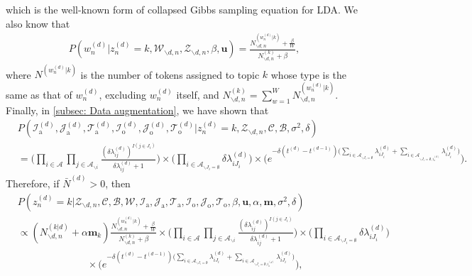 \documentclass[a4paper]{article}
\begin{document}
 which is the well-known form of collapsed Gibbs sampling equation for LDA. We also know that \begin{equation}
 \begin{aligned} 
 P(w^{(d)}_n|z^{(d)}_n=k, \mathcal{W}_{\backslash d, n}, \mathcal{Z}_{\backslash d, n}, \beta, \boldsymbol{u} )=\frac{N^{(w_n^{(d)}|k)}_{\backslash d, n}+\frac{\beta}{W} }{N^{(k)}_{\backslash d, n}+\beta},
 \end{aligned}
 \end{equation}
 where $N^{(w_n^{(d)}|k)}$ is the number of tokens assigned to topic $k$ whose type is the same as that of $w_n^{(d)}$, excluding $w_n^{(d)}$ itself, and $N^{(k)}_{\backslash d, n}=\sum_{w=1}^W N_{\backslash d, n}^{(w_n^{(d)}|k)}$. Finally, in \ref{subsec: Data augmentation}, we have shown that
 \begin{equation}
 \begin{aligned}
& P(\mathcal{I}^{(d)}_{\mbox{a}}, \mathcal{J}^{(d)}_{\mbox{a}}, \mathcal{T}^{(d)}_{\mbox{a}}, \mathcal{I}^{(d)}_{\mbox{o}}, \mathcal{J}^{(d)}_{\mbox{o}}, \mathcal{T}^{(d)}_{\mbox{o}}| z^{(d)}_n=k, \mathcal{Z}_{\backslash d, n}, \mathcal{C}, \mathcal{B}, \sigma^2, \delta)\\&=\Big(\prod_{i\in \mathcal{A}}\prod_{j \in \mathcal{A}_{\backslash i }} \frac{(\delta\lambda^{(d)}_{ij})^{I(j \in J_i)}}{\delta\lambda^{(d)}_{ij}+1}\Big)\times \Big(\prod_{i\in \mathcal{A}_{\backslash J_i=\emptyset}} \delta\lambda^{(d)}_{iJ_i}\Big) \times \Big(e^{-\delta(t^{(d)}-t^{(d-1)})\big(\sum\limits_{i \in \mathcal{A}_{\backslash J_i=\emptyset}}\lambda^{(d)}_{i{J_i}}+\sum\limits_{i \in \mathcal{A}_{\backslash J_i=\emptyset, i_o^{(d)}}}\lambda^{(d)}_{i{J_i}}\big)}\Big).
 \end{aligned}
 \end{equation}
 Therefore, if $\bar N^{(d)} > 0$, then
 \begin{equation}
 \begin{aligned}
  &P(z^{(d)}_n=k|\mathcal{Z}_{\backslash d, n},   \mathcal{C},   \mathcal{B},\mathcal{W}, \mathcal{I}_{\mbox{a}}, \mathcal{J}_{\mbox{a}}, \mathcal{T}_{\mbox{a}}, \mathcal{I}_{\mbox{o}}, \mathcal{J}_{\mbox{o}}, \mathcal{T}_{\mbox{o}}, \beta, \boldsymbol{u}, \alpha, \boldsymbol{m}, \sigma^2, \delta)\\&\propto (N^{(k|d)}_{\backslash d, n}+\alpha \boldsymbol{m}_k)\frac{N^{(w_n^{(d)}|k)}_{\backslash d, n}+\frac{\beta}{W} }{N^{(k)}_{\backslash d, n}+\beta}\times \Big(\prod_{i\in \mathcal{A}}\prod_{j \in \mathcal{A}_{\backslash i }} \frac{(\delta\lambda^{(d)}_{ij})^{I(j \in J_i)}}{\delta\lambda^{(d)}_{ij}+1}\Big)\times \Big(\prod_{i\in \mathcal{A}_{\backslash J_i=\emptyset}} \delta\lambda^{(d)}_{iJ_i}\Big) \\&\quad\quad\quad\quad\quad\quad\quad\times \Big(e^{-\delta(t^{(d)}-t^{(d-1)})\big(\sum\limits_{i \in \mathcal{A}_{\backslash J_i=\emptyset}}\lambda^{(d)}_{i{J_i}}+\sum\limits_{i \in \mathcal{A}_{\backslash J_i=\emptyset, i_o^{(d)}}}\lambda^{(d)}_{i{J_i}}\big)}\Big), 
 \end{aligned}
 \end{equation}
\end{document}
